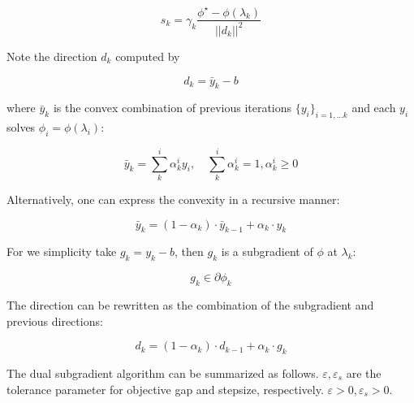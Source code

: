 \begin{equation}\label{eq:step_size}
  s_{k} = \gamma_k\frac{\phi^\star - \phi(\lambda_k)}{||d_{k}||^2}
\end{equation}

Note the direction \(d_k\) computed by

\begin{equation}\label{eq:direction}
  d_k = \bar y_k - b
\end{equation}

where \(\bar y_k\) is the convex combination of previous iterations
\(\{y_i\}_{i=1,...k}\) and each \(y_i\) solves
\(\phi_i = \phi(\lambda_i)\):

\begin{equation}\bar y_k = \sum^i_k \alpha^i_k y_i,\quad  \sum^i_k \alpha^i_k = 1, \alpha^i_k \ge 0\end{equation}

Alternatively, one can express the convexity in a recursive manner:

\begin{equation}\bar y_k = (1-\alpha_k)\cdot\bar y_{k-1} + \alpha_k \cdot y_k \end{equation}

For we simplicity take \(g_k= y_k - b\), then \(g_k\) is a subgradient
of \(\phi\) at \(\lambda_k\):

\begin{equation}g_k \in \partial \phi_k\end{equation}

The direction can be rewritten as the combination of the subgradient and
previous directions:

\begin{equation}\label{eq:direction_recursive}
  d_k = (1-\alpha_k) \cdot d_{k-1} + \alpha_k\cdot g_k
\end{equation}


The dual subgradient algorithm can be summarized as follows.
\(\varepsilon,\varepsilon_s\) are the tolerance parameter for objective gap and stepsize, respectively.
\(\varepsilon > 0 ,\varepsilon_s > 0\).

